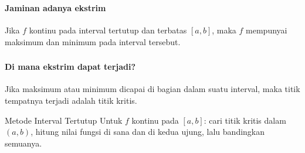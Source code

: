 \documentclass{../../kalkulus-ppt}
\begin{document}
\begin{frame}
\frametitle{\insertsection}
\framesubtitle{Jaminan adanya ekstrim}

\begin{teorema}
Jika $f$ kontinu pada interval tertutup dan terbatas $[a,b]$, maka $f$ mempunyai maksimum dan minimum pada interval tersebut.
\end{teorema}
\end{frame}

\begin{frame}
\frametitle{\insertsection}
\framesubtitle{Di mana ekstrim dapat terjadi?}

\begin{teorema}
Jika maksimum atau minimum dicapai di bagian dalam suatu interval, maka titik tempatnya terjadi adalah titik kritis.
\end{teorema}
\begin{block}{Metode Interval Tertutup}
Untuk $f$ kontinu pada $[a,b]$: cari titik kritis dalam $(a,b)$, hitung nilai fungsi di sana dan di kedua ujung, lalu bandingkan semuanya.
\end{block}
\end{frame}
\end{document}
